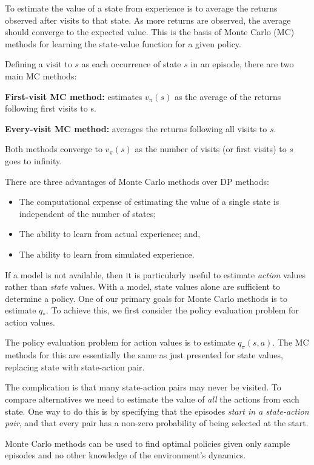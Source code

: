 \documentclass{article}
\providecommand{\tightlist}{%
  \setlength{\itemsep}{0pt}\setlength{\parskip}{0pt}}
\begin{document}
To estimate the value of a state from experience is to
average the returns observed after visits to that state. As more returns
are observed, the average should converge to the expected value. This is the basis of Monte Carlo (MC) methods for learning the state-value function for a given policy.

Defining a visit to \(s\) as each occurrence of state \(s\) in an episode, there are two main MC methods:

\textbf{First-visit MC method:} estimates \(v_\pi(s)\) as the average of
the returns following first visits to s.

\textbf{Every-visit MC method:} averages the returns following all
visits to \(s\).

Both methods converge to \(v_\pi(s)\) as the number of visits (or first
visits) to \(s\) goes to infinity.

There are three advantages of Monte Carlo methods over DP methods:

\begin{itemize}
\tightlist
\item
  The computational expense of estimating the value of a single state is
  independent of the number of states;
\item
  The ability to learn from actual experience; and,
\item
  The ability to learn from simulated experience.
\end{itemize}

If a model is not available, then it is particularly useful to estimate
\emph{action} values rather than \emph{state} values. With a model,
state values alone are sufficient to determine a policy. One of our
primary goals for Monte Carlo methods is to estimate \(q_*\). To achieve
this, we first consider the policy evaluation problem for action values.

The policy evaluation problem for action values is to estimate
\(q_\pi(s,a)\). The MC methods for this are essentially the same as just
presented for state values, replacing state with state-action pair.

The complication is that many state-action pairs may never be visited.
To compare alternatives we need to estimate the value of \emph{all} the
actions from each state. One way to do this is by specifying that the episodes \emph{start in a state-action pair}, and that every pair has a non-zero probability of being selected at the start.

Monte Carlo methods can be used to find optimal policies given only
sample episodes and no other knowledge of the environment's dynamics.
\end{document}
